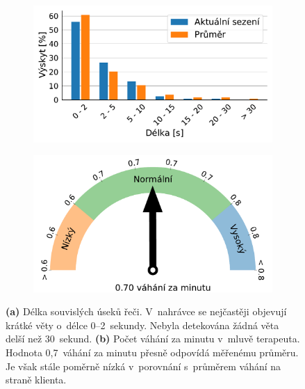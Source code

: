 \begin{figure}[ht]
    \begin{subfigure}{0.5\textwidth}
        \includegraphics[width=\linewidth]{obrazky-figures/text_plots/bounds_len_client.pdf}
        \caption{}
    \end{subfigure}%
    \hspace*{\fill}
    \begin{subfigure}{0.5\textwidth}
        \centering
        \includegraphics[width=\linewidth]{obrazky-figures/text_plots/hesitations_therapist.pdf}
        \caption{}
    \end{subfigure}
    
     \caption{\textbf{(a)} Délka souvislých úseků řeči. V~nahrávce se nejčastěji objevují krátké věty o~délce 0--2~sekundy. Nebyla detekována žádná věta delší než 30~sekund. \textbf{(b)} Počet váhání za minutu v~mluvě terapeuta. Hodnota 0,7~váhání za minutu přesně odpovídá měřenému průměru. Je však stále poměrně nízká v~porovnání s~průměrem váhání na straně klienta.}
  \label{fig:Statisctics_hesitations_speech_len}
\end{figure}

